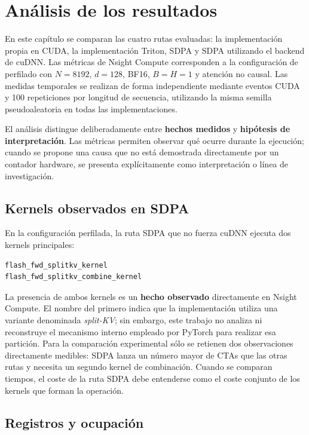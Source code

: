 \chapter{Análisis de los resultados}

En este capítulo se comparan las cuatro rutas evaluadas: la implementación propia en CUDA, la implementación Triton, SDPA y SDPA utilizando el backend de cuDNN. Las métricas de Nsight Compute corresponden a la configuración de perfilado con \(N=8192\), \(d=128\), BF16, \(B=H=1\) y atención no causal. Las medidas temporales se realizan de forma independiente mediante eventos CUDA y 100 repeticiones por longitud de secuencia, utilizando la misma semilla pseudoaleatoria en todas las implementaciones.

El análisis distingue deliberadamente entre \textbf{hechos medidos} y \textbf{hipótesis de interpretación}. Las métricas permiten observar qué ocurre durante la ejecución; cuando se propone una causa que no está demostrada directamente por un contador hardware, se presenta explícitamente como interpretación o línea de investigación.

\section{Kernels observados en SDPA}

En la configuración perfilada, la ruta SDPA que no fuerza cuDNN ejecuta dos kernels principales:

\begin{verbatim}
flash_fwd_splitkv_kernel
flash_fwd_splitkv_combine_kernel
\end{verbatim}

La presencia de ambos kernels es un \textbf{hecho observado} directamente en Nsight Compute. El nombre del primero indica que la implementación utiliza una variante denominada \textit{split-KV}; sin embargo, este trabajo no analiza ni reconstruye el mecanismo interno empleado por PyTorch para realizar esa partición. Para la comparación experimental sólo se retienen dos observaciones directamente medibles: SDPA lanza un número mayor de CTAs que las otras rutas y necesita un segundo kernel de combinación. Cuando se comparan tiempos, el coste de la ruta SDPA debe entenderse como el coste conjunto de los kernels que forman la operación.

\section{Registros y ocupación}

